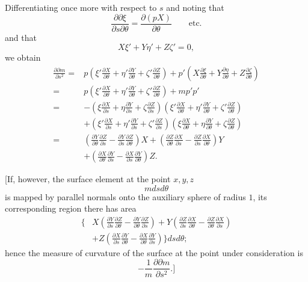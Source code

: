 %
\par\indent Differentiating once more with respect to $s$ and noting that
\[
\frac{\partial\partial\xi}{\partial s\partial\theta}=\frac{\partial(pX)}{\partial\theta}\qquad\text{etc.}
\]
and that
\[
X\xi'+Y\eta'+Z\zeta'=0,
\]
we obtain
\[
\begin{aligned}
\frac{\partial\partial m}{\partial s^{2}}={}&p\left(\xi'\frac{\partial X}{\partial\theta}+\eta'\frac{\partial Y}{\partial\theta}+\zeta'\frac{\partial Z}{\partial\theta}\right)+p'\left(X\frac{\partial\xi}{\partial\theta}+Y\frac{\partial\eta}{\partial\theta}+Z\frac{\partial\zeta}{\partial\theta}\right)\\
={}&p\left(\xi'\frac{\partial X}{\partial\theta}+\eta'\frac{\partial Y}{\partial\theta}+\zeta'\frac{\partial Z}{\partial\theta}\right)+mp'p'\\
={}&-\left(\xi\frac{\partial X}{\partial s}+\eta\frac{\partial Y}{\partial s}+\zeta\frac{\partial Z}{\partial s}\right)\left(\xi'\frac{\partial X}{\partial\theta}+\eta'\frac{\partial Y}{\partial\theta}+\zeta'\frac{\partial Z}{\partial\theta}\right)\\
&+\left(\xi'\frac{\partial X}{\partial s}+\eta'\frac{\partial Y}{\partial s}+\zeta'\frac{\partial Z}{\partial s}\right)\left(\xi\frac{\partial X}{\partial\theta}+\eta\frac{\partial Y}{\partial\theta}+\zeta\frac{\partial Z}{\partial\theta}\right)\\
={}&\left(\frac{\partial Y}{\partial\theta}\frac{\partial Z}{\partial s}-\frac{\partial Y}{\partial s}\frac{\partial Z}{\partial\theta}\right)X+\left(\frac{\partial Z}{\partial\theta}\frac{\partial X}{\partial s}-\frac{\partial Z}{\partial s}\frac{\partial X}{\partial\theta}\right)Y\\
&+\left(\frac{\partial X}{\partial\theta}\frac{\partial Y}{\partial s}-\frac{\partial X}{\partial s}\frac{\partial Y}{\partial\theta}\right)Z.
\end{aligned}
\]

[If, however, the surface element at the point $x,y,z$
\[
mdsd\theta
\]
is mapped by parallel normals onto the auxiliary sphere of radius $1$, its corresponding region there has area
\[
\begin{aligned}
\Biggl\{&X\left(\frac{\partial Y}{\partial s}\frac{\partial Z}{\partial\theta}-\frac{\partial Y}{\partial\theta}\frac{\partial Z}{\partial s}\right)+Y\left(\frac{\partial Z}{\partial s}\frac{\partial X}{\partial\theta}-\frac{\partial Z}{\partial\theta}\frac{\partial X}{\partial s}\right)\\
&+Z\left(\frac{\partial X}{\partial s}\frac{\partial Y}{\partial\theta}-\frac{\partial X}{\partial\theta}\frac{\partial Y}{\partial s}\right)\Biggr\}dsd\theta;
\end{aligned}
\]
hence the measure of curvature of the surface at the point under consideration is
\[
-\frac1m\frac{\partial\partial m}{\partial s^{2}}.\biggr]
\]
